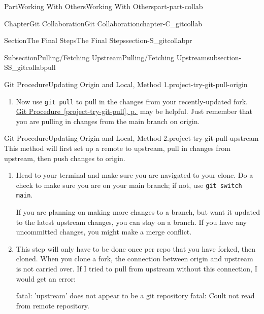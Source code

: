 \documentclass[twoside,10pt,]{book}
\newcommand{\xreffont}{\relax}
\newcommand{\mono}[1]{\texttt{#1}}
\begin{document}
\begin{partptx}{Part}{Working With Others}{}{Working With Others}{}{}{part-part-collab}
\begin{chapterptx}{Chapter}{Git Collaboration}{}{Git Collaboration}{}{}{chapter-C_gitcollab}
\begin{sectionptx}{Section}{The Final Steps}{}{The Final Steps}{}{}{section-S_gitcollabpr}
\begin{subsectionptx}{Subsection}{Pulling\slash{}Fetching Upstream}{}{Pulling\slash{}Fetching Upstream}{}{}{subsection-SS_gitcollabpull}
\begin{project}{Git Procedure}{Updating Origin and Local, Method 1.}{project-try-git-pull-origin}
\begin{enumerate}[font=\bfseries,label=(\alph*),ref=\alph*]
\item{}Now use \mono{git pull} to pull in the changes from your recently-updated fork. \hyperref[project-try-git-pull]{Git Procedure~{\xreffont\ref{project-try-git-pull}}, p.\,\pageref{project-try-git-pull}} may be helpful. Just remember that you are pulling in changes from the main branch on origin.%
\end{enumerate}%
\end{project}%
\begin{project}{Git Procedure}{Updating Origin and Local, Method 2.}{project-try-git-pull-upstream}%
%
%
%
%
%
%
%
%
This method will first set up a remote to upstream, pull in changes from upstream, then push changes to origin.%
\begin{enumerate}[font=\bfseries,label=(\alph*),ref=\alph*]%
\item{}Head to your terminal and make sure you are navigated to your clone. Do a check to make sure you are on your main branch; if not, use \mono{git switch main}.%
\par
If you are planning on making more changes to a branch, but want it updated to the latest upstream changes, you can stay on a branch. If you have any uncommitted changes, you might make a merge conflict.%
\item{}This step will only have to be done once per repo that you have forked, then cloned. When you clone a fork, the connection between origin and upstream is not carried over. If I tried to pull from upstream without this connection, I would get an error:%
\begin{console}{0}{1}{0}
fatal: 'upstream' does not appear to be a git repository
fatal: Coult not read from remote repository.


\end{console}
\end{enumerate}
\end{project}
\end{subsectionptx}
\end{sectionptx}
\end{chapterptx}
\end{partptx}
\end{document}
